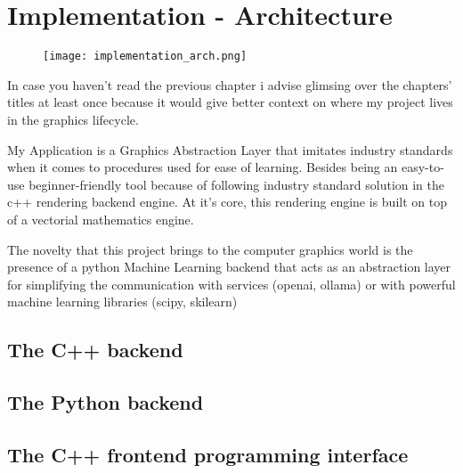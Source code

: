 


\chapter*{Implementation - Architecture}


  \begin{figure}
    \begin{center}
      \texttt{[image: implementation\_arch.png]}
    \end{center}
  \end{figure}
  



  In case you haven't read the previous chapter i advise glimsing over the chapters' titles at least once because it would give better context on where my project lives in the graphics lifecycle.

  My Application is a Graphics Abstraction Layer that imitates industry standards when it comes to procedures used for ease of learning.
  Besides being an easy-to-use beginner-friendly tool because of following industry standard solution in the c++ rendering backend engine. At it's core, this rendering engine is built on top of a vectorial mathematics engine.

  The novelty that this project brings to the computer graphics world is the presence of a python Machine Learning backend that acts as an abstraction layer for simplifying the communication with services (openai, ollama) or with powerful machine learning libraries (scipy, skilearn) 


  

  \section*{The C++    backend}
  \section*{The Python backend}

  \section*{The C++    frontend programming interface}
